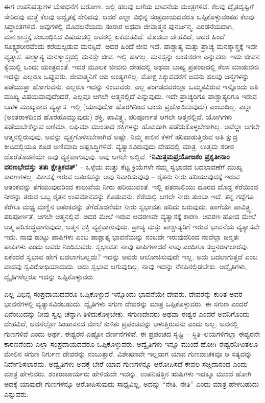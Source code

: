 ಈಗ ಉಪನಿಷತ್ತುಗಳ ಬೋಧನೆಗೆ ಬರೋಣ. ಅಲ್ಲಿ ಹಲವು ಬಗೆಯ ಭಾವನೆಯ ಮಂತ್ರಗಳಿವೆ. ಕೆಲವು ದ್ವೈತದೃಷ್ಟಿಗೆ ಸೇರಿದವು ಮತ್ತೆ ಕೆಲವು ಅದ್ವೈತಕ್ಕೆ ಸೇರಿದವು. ಆದರೆ ಎಲ್ಲಾ ವಿಭಿನ್ನ ಸಂಪ್ರದಾಯದವರೂ ಒಪ್ಪಿಕೊಳ್ಳುವಂತಹ ಕೆಲವು ಸಿದ್ಧಾಂತಗಳಿವೆ. ಅವುಗಳಲ್ಲಿ ಮೊದಲನೆಯದು ಸಂಸಾರ ಅಥವಾ ಜೀವಾತ್ಮನ ಪುನರ್ಜನ್ಮ. ಎರಡನೆಯದಾಗಿ, ಮನಃಶಾಸ್ತ್ರಕ್ಕೆ ಸಂಬಂಧಿಸಿದ ವಿಷಯದಲ್ಲಿ ಅವರಲ್ಲಿ ಏಕಮತವಿದೆ. ಮೊದಲು ದೇಹವಿದೆ, ಅದರ ಹಿಂದೆ ಸೂಕ್ಷ್ಮಶರೀರವೆಂದು ಕರೆಯಲ್ಪಡುವ ಮನಸ್ಸಿದೆ. ಅದರ ಹಿಂದೆ ಜೀವ ಇದೆ. ಪಾಶ್ಚಾತ್ಯ ಮತ್ತು ಪ್ರಾಚ್ಯ ಮನಶ್ಶಾಸ್ತ್ರಕ್ಕೆ ಇದೇ ವ್ಯತ್ಯಾಸ. ಪಾಶ್ಚಾತ್ಯ ಮನಶ್ಶಾಸ್ತ್ರದಲ್ಲಿ ಮನಸ್ಸೇ ಜೀವ. ಇಲ್ಲಿ ಹಾಗಲ್ಲ. ಮನಸ್ಸನ್ನು ಅಂತಃಕರಣ ಎನ್ನುವರು. ಇದು ಜೀವನ ಕೈಯಲ್ಲಿ ಒಂದು ಯಂತ್ರದಂತೆ. ಇದರ ಮೂಲಕ ಜೀವನು ದೇಹದಲ್ಲಿ ಅಥವಾ ಬಾಹ್ಯ ಪ್ರಪಂಚದಲ್ಲಿ ಕೆಲಸ ಮಾಡುವನು. ಇದನ್ನು ಎಲ್ಲರೂ ಒಪ್ಪುವರು. ಜೀವಾತ್ಮನಿಗೆ ಆದಿ ಅಂತ್ಯಗಳಿಲ್ಲ. ಮೋಕ್ಷ ಸಿಕ್ಕುವವರೆಗೆ ಅವನು ಹಲವು ಜನ್ಮಗಳನ್ನು ಪಡೆಯುತ್ತಾ ಹೋಗುವನು. ಎಲ್ಲರೂ ಇದನ್ನು ನಂಬುವರು. ಎಲ್ಲ ಪಂಗಡದವರಲ್ಲೂ ಒಮ್ಮತವಿರುವ ಇನ್ನೊಂದು ಅತಿ ಮುಖ್ಯ ವಿಷಯವಾವುದೆಂದರೆ, ಎಲ್ಲವೂ ಆಗಲೇ ಆತ್ಮನಲ್ಲಿದೆ ಎನ್ನುವುದು. ಇದೇ ಪ್ರಾಚ್ಯರಿಗೂ ಪಾಶ್ಚಾತ್ಯರಿಗೂ ಇರುವ ಬಹಳ ಮುಖ್ಯವಾದ ವ್ಯತ್ಯಾಸ. ಇಲ್ಲಿ  (ಯಾವುದೋ ಹೊರಗಿನಿಂದ ಬಂದು ಪ್ರಚೋದಿಸುವುದು) ಎಂಬುದಿಲ್ಲ. ಎಲ್ಲಾ  (ಅಂತರಾಳದಿಂದ ಹೊರಹೊಮ್ಮುವುದು) ಶಕ್ತಿ, ಪಾವಿತ್ರ್ಯ, ಪರಿಪೂರ್ಣತೆ ಆಗಲೇ ಆತ್ಮನಲ್ಲಿವೆ. ಯೋಗಿಗಳು ಪಡೆಯಬೇಕೆನ್ನುವ ಅಣಿಮಾ, ಲಘಿಮಾ ಮುಂತಾದ ಶಕ್ತಿಗಳನ್ನು ಹೊಸದಾಗಿ ಪಡೆದುಕೊಳ್ಳಬೇಕಾಗಿಲ್ಲ. ಅವೆಲ್ಲಾ ಆಗಲೇ ಆತ್ಮನಲ್ಲಿರುವುವು. ಅವನ್ನು ವ್ಯಕ್ತಗೊಳಿಸಬೇಕಾಗಿದೆ ಅಷ್ಟೇ. ನಿಮ್ಮ ಕಾಲಿನ ಕೆಳಗೆ ಹರಿದಾಡುತ್ತಿರುವ ಅತಿ ಕ್ಷುದ್ರ ಕೀಟದಲ್ಲಿಯೂ ಕೂಡ ಅಣಿಮಾದಿ ಅಷ್ಟಸಿದ್ಧಿಗಳಿವೆ. ವ್ಯತ್ಯಾಸವಿರುವುದು ದೇಹದಲ್ಲಿ ಮಾತ್ರ. ಉತ್ತಮ ಶರೀರ ದೊರೆತೊಡನೆಯೇ ಅವು ವ್ಯಕ್ತವಾಗುವುವು. ಅವು ಆಗಲೇ ಅಲ್ಲಿವೆ. \textbf{‘ನಿಮಿತ್ತಮಪ್ರಯೋಜಕಂ ಪ್ರಕೃತೀನಾಂ ವರಣಭೇದಸ್ತು ತತಃ ಕ್ಷೇತ್ರಿಕವತ್​’} – ಒಳ್ಳೆಯ ಮತ್ತು ಕೆಟ್ಟ ಕ್ರಿಯೆಗಳೇ ನಮ್ಮ ಸ್ವಭಾವದ ಬದಲಾವಣೆಗೆ ಮುಖ್ಯ ಕಾರಣಗಳಲ್ಲ. ವಿಕಾಸಕ್ಕೆ ಇರುವ ಆತಂಕವನ್ನು ಅವು ನಿವಾರಿಸುವುವು – ರೈತನು ನೀರು ಹರಿಯುವುದಕ್ಕೆ ಇರುವ ಆತಂಕವನ್ನು ತೆಗೆಯುವುದರಿಂದ ಕಾಲುವೆಯ ನೀರು ಹರಿಯುವಂತೆ. ಇಲ್ಲಿ ಪತಂಜಲಿಯು ದೂರದ ದೊಡ್ಡ ಕೆರೆಯಿಂದ ನೀರನ್ನು ತರುವ ಒಬ್ಬ ರೈತನ ಉಪಮಾನವನ್ನು ಕೊಡುವನು. ಕೆರೆಯಲ್ಲಿ ಆಗಲೇ ನೀರು ತುಂಬಾ ಇದೆ. ತನ್ನ ಗದ್ದೆಗೂ ಕೆರೆಗೂ ಮಧ್ಯೆ ಮಣ್ಣಿನ ಆತಂಕವನ್ನು ತೆಗೆದೊಡನೆಯೇ ನೀರು ಸ್ವಭಾವತಃ ಹರಿದು ಬರುವುದು. ಹಾಗೆಯೇ ಪಾವಿತ್ರ್ಯ, ಪರಿಪೂರ್ಣತೆ, ಆಗಲೇ ಆತ್ಮನಲ್ಲಿವೆ. ಅದರ ಮೇಲೆ ಇರುವ ಆವರಣವೇ ವ್ಯತ್ಯಾಸಕ್ಕೆ ಕಾರಣ. ಆವರಣ ಹೋದ ಮೇಲೆ ಆತ್ಮ ಪರಿಶುದ್ಧವಾಗುವುದು, ಆತ್ಮನ ಶಕ್ತಿ ವ್ಯಕ್ತವಾಗುವುದು. ಪ್ರಾಚ್ಯ ಮತ್ತು ಪಾಶ್ಚಾತ್ಯರಿಗೆ ಇರುವ ಭಾವನೆಯ ವ್ಯತ್ಯಾಸವೇ ಇದು. ನಾವು ಹುಟ್ಟು ಪಾಪಿಗಳು ಎಂಬ ಪಾಶ್ಚಾತ್ಯ ಭಾವನೆಯನ್ನು ನಂಬದೇ ಇರುವುದರಿಂದ ನಾವೆಲ್ಲಾ ಜನ್ಮತಃ ಪಾಪಿಗಳು ಎಂದು ಅವರು ನಿಂದಿಸುವರು. ಸ್ವಭಾವತಃ ನಾವು ಪಾಪಿಗಳಾದರೆ ನಾವು ಎಂದಿಗೂ ಸಜ್ಜನರಾಗಲಾರೆವು. ಏಕೆಂದರೆ ಸ್ವಭಾವ ಹೇಗೆ ಬದಲಾಗಬಲ್ಲದು? ಇದನ್ನು ಅವರು ಆಲೋಚಿಸುವುದೇ ಇಲ್ಲ. ಅದು ಬದಲಾಗುತ್ತದೆ ಎಂಬ ವಾದವು ಸ್ವವಿರೋಧಿಯಾದುದು. ಅದು ಸ್ವಭಾವ ಆಗುವುದಿಲ್ಲ. ನಾವು ಇದನ್ನು ನೆನಪಿನಲ್ಲಿಡಬೇಕು. ಅದ್ವೈತಿಗಳು, ದ್ವೈತಿಗಳೆಲ್ಲರೂ ಇದನ್ನು ಒಪ್ಪಿಕೊಳ್ಳುವರು.

ಎಲ್ಲ ವಿಭಿನ್ನ ಸಂಪ್ರದಾಯದವರೂ ಒಪ್ಪಿಕೊಳ್ಳುವ ಇನ್ನೊಂದು ಭಾವನೆಯೇ ದೇವರು. ದೇವರನ್ನು ಕುರಿತ ಅವರ ಭಾವನೆಗಳಲ್ಲಿ ವ್ಯತ್ಯಾಸವಿರಬಹುದು. ದ್ವೈತಿಗಳು ಸಗುಣ ದೇವರನ್ನು ಮಾತ್ರ ಒಪ್ಪಿಕೊಳ್ಳುವರು. ಈ ಸಗುಣ ಎಂದರೆ ಏನೆಂಬುದನ್ನು ನೀವು ಸ್ವಲ್ಪ ಚೆನ್ನಾಗಿ ತಿಳಿದುಕೊಳ್ಳಬೇಕು. ಸಗುಣದೇವರು ಅಥವಾ ಈಶ್ವರ ಎಂದರೆ ಅವನಿಗೊಂದು ದೇಹವಿದೆ, ಅವನೆಲ್ಲೋ ಸಿಂಹಾಸನದ ಮೇಲೆ ಕುಳಿತು ಪ್ರಪಂಚವನ್ನು ಆಳುತ್ತಿರುವನು ಎಂದು ಅಲ್ಲ. ಅವನಲ್ಲಿ ಗುಣಗಳಿವೆ ಎಂದು ಅರ್ಥ. ಈಶ್ವರನ ಎಷ್ಟೋ ವರ್ಣನೆಗಳಿವೆ. ಈ ಪ್ರಪಂಚದ ಸೃಷ್ಟಿ – ಸ್ಥಿತಿ–ಲಯಗಳಿಗೆಲ್ಲಾ ಈಶ್ವರನೇ ಕಾರಣನೆಂದು ಎಲ್ಲಾ ಸಂಪ್ರದಾಯದವರೂ ಒಪ್ಪಿಕೊಳ್ಳುವರು. ಅದ್ವೈತಿಗಳು ಇನ್ನೂ ಮುಂದೆ ಹೋಗಿ ಈಶ್ವರನಿಗಿಂತಲೂ ಮೇಲಿನ ಸಗುಣ ನಿರ್ಗುಣ ದೇವರನ್ನು ನಂಬುತ್ತಾರೆ. ವಿಶೇಷಣವೇ ಇಲ್ಲದಾಗ ಯಾವ ಗುಣವಾಚಕವೂ ಆ ಸತ್ಯವನ್ನು ನಿರ್ದೇಶಿಸಲಾರದು. ಅದ್ವೈತಿಗಳು ಅದಕ್ಕೆ ಬೇರೆ ಯಾವ ಗುಣಗಳನ್ನೂ ಆರೋಪಿಸದೆ ಕೇವಲ ಸಚ್ಚಿದಾನಂದ ಎಂದು ಮಾತ್ರ ಹೇಳುವರು. ಶಂಕರಾಚಾರ್ಯರು ಹೇಳಿದುದೇ ಇದನ್ನು. ಉಪನಿಷತ್ತಿನ ಋಷಿಗಳು ಇದಕ್ಕೂ ಮುಂದೆ ಹೋಗಿ ಅದಕ್ಕೆ ಯಾವುದೇ ಗುಣಗಳನ್ನೂ ಆರೋಪಿಸುವುದು ಸಾಧ್ಯವಿಲ್ಲ, ಅದನ್ನು “ನೇತಿ, ನೇತಿ” ಎಂದು ಮಾತ್ರ ಹೇಳಬಹುದು ಎನ್ನುವರು.

